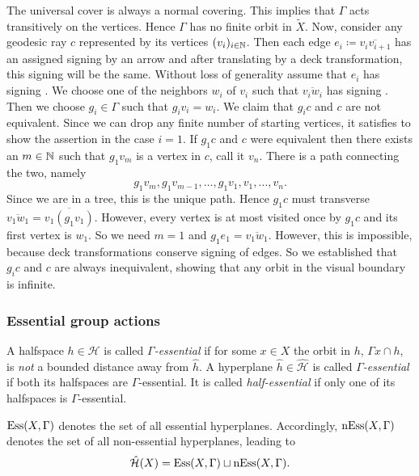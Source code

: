 \begin{bsp}
\begin{description}
    The universal cover is always a normal covering. This implies that \(\Gamma\) acts transitively on the vertices. Hence \(\Gamma\) has no finite orbit in \(\tilde X\). Now, consider any geodesic ray \(c\) represented by its vertices \((v_i)_{i \in \mathbb{N}}\). Then each edge \(e_i \coloneqq \overline{v_iv_{i+1}}\) has an assigned signing by an arrow and after translating by a deck transformation, this signing will be the same. Without loss of generality assume that \(e_i\) has signing . We choose one of the neighbors \(w_i\) of \(v_i\) such that \(\overline{v_iw_i}\) has signing . Then we choose \(g_i \in \Gamma\) such that \(g_iv_i = w_i\). We claim that \(g_ic\) and \(c\) are not equivalent. Since we can drop any finite number of starting vertices, it satisfies to show the assertion in the case \(i=1\). If \(g_1c\) and \(c\) were equivalent then there exists an \(m \in \mathbb{N}\) such that \(g_1v_m\) is a vertex in \(c\), call it \(v_n\). There is a path connecting the two, namely
    \[
      g_1v_m, g_1v_{m-1}, \dots, g_1v_1, v_1, \dots, v_n.
    \]
    Since we are in a tree, this is the unique path. Hence \(g_1c\) must transverse \(\overline{v_1w_1} = \overline{v_1 (g_1v_1)}\). However, every vertex is at most visited once by \(g_1c\) and its first vertex is \(w_1\). So we need \(m=1\) and \(g_1e_1 = \overline{v_1w_1}\). However, this is impossible, because deck transformations conserve signing of edges. So we established that \(g_ic\) and \(c\) are always inequivalent, showing that any orbit in the visual boundary is infinite.
  \end{description}
\end{bsp}

\subsubsection*{Essential group actions}
\label{sec:essential}

\begin{defin}
  A halfspace \(h \in \mathcal{H}\) is called \emph{\(\Gamma\)-essential} if for some \(x \in X\) the orbit in \(h\), \(\Gamma x \cap h\), is \emph{not} a bounded distance away from \(\hat h\). A hyperplane \(\hat h \in \mathcal{\hat H}\) is called \emph{\(\Gamma\)-essential} if both its halfspaces are \(\Gamma\)-essential. It is called \emph{half-essential} if only one of its halfspaces is \(\Gamma\)-essential.

  \(\operatorname{Ess}(X,\Gamma)\) denotes the set of all essential hyperplanes. Accordingly, \(\operatorname{nEss}(X,\Gamma)\) denotes the set of all non-essential hyperplanes, leading to
  \[
    \mathcal{\hat H}(X) = \operatorname{Ess}(X, \Gamma) \sqcup \operatorname{nEss}(X, \Gamma).
  \]
\end{defin}

